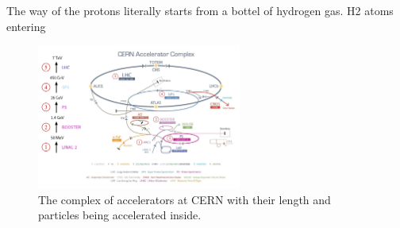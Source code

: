 The way of the protons literally starts from a bottel of hydrogen gas.
H2 atoms entering 


\begin{figure}[t]
  \centering
  \includegraphics[width=0.6\textwidth]{02_experimental_setup/plots/Cern-Accelerator-Complex-2.png}
  \caption{The complex of accelerators at CERN with their length and particles being accelerated inside.}
  \label{fig:AccelCERN}
\end{figure}


